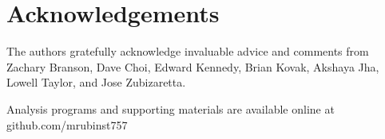 \documentclass{article}
\begin{document}
\section*{Acknowledgements}

The authors gratefully acknowledge invaluable advice and comments from Zachary Branson, Dave Choi, Edward Kennedy, Brian Kovak, Akshaya Jha, Lowell Taylor, and Jose Zubizaretta.

\begin{supplement}
Analysis programs and supporting materials are available online at github.com/mrubinst757
\end{supplement}



\end{document}
